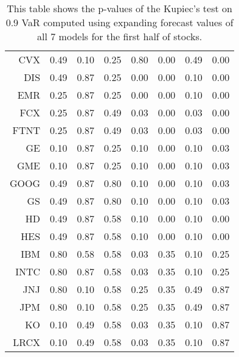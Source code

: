 \begin{table}[ht]
\begin{tabular}{rrrrrrrr}
  CVX & 0.49 & 0.10 & 0.25 & 0.80 & 0.00 & 0.49 & 0.00 \\ 
  DIS & 0.49 & 0.87 & 0.25 & 0.00 & 0.00 & 0.10 & 0.00 \\ 
  EMR & 0.25 & 0.87 & 0.25 & 0.00 & 0.00 & 0.10 & 0.00 \\ 
  FCX & 0.25 & 0.87 & 0.49 & 0.03 & 0.00 & 0.03 & 0.00 \\ 
  FTNT & 0.25 & 0.87 & 0.49 & 0.03 & 0.00 & 0.03 & 0.00 \\ 
  GE & 0.10 & 0.87 & 0.25 & 0.10 & 0.00 & 0.10 & 0.03 \\ 
  GME & 0.10 & 0.87 & 0.25 & 0.10 & 0.00 & 0.10 & 0.03 \\ 
  GOOG & 0.49 & 0.87 & 0.80 & 0.10 & 0.00 & 0.10 & 0.03 \\ 
  GS & 0.49 & 0.87 & 0.80 & 0.10 & 0.00 & 0.10 & 0.03 \\ 
  HD & 0.49 & 0.87 & 0.58 & 0.10 & 0.00 & 0.10 & 0.00 \\ 
  HES & 0.49 & 0.87 & 0.58 & 0.10 & 0.00 & 0.10 & 0.00 \\ 
  IBM & 0.80 & 0.58 & 0.58 & 0.03 & 0.35 & 0.10 & 0.25 \\ 
  INTC & 0.80 & 0.87 & 0.58 & 0.03 & 0.35 & 0.10 & 0.25 \\ 
  JNJ & 0.80 & 0.10 & 0.58 & 0.25 & 0.35 & 0.49 & 0.87 \\ 
  JPM & 0.80 & 0.10 & 0.58 & 0.25 & 0.35 & 0.49 & 0.87 \\ 
  KO & 0.10 & 0.49 & 0.58 & 0.03 & 0.35 & 0.10 & 0.87 \\ 
  LRCX & 0.10 & 0.49 & 0.58 & 0.03 & 0.35 & 0.10 & 0.87 \\ 
   \hline
\end{tabular}
\caption[Kupiec's test p-values, alpha =0.9 (1)]{This table shows the p-values of the Kupiec's test on 0.9 VaR computed using expanding forecast values of all 7 models for the first half of stocks.} 
\label{Table:Kupiec_test_expanding_0.9_1}
\end{table}
